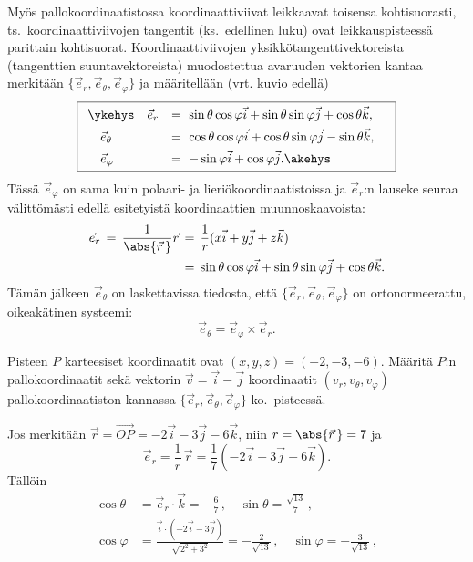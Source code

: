 Myös pallokoordinaatistossa koordinaattiviivat leikkaavat toisensa kohtisuorasti, ts.\
koordinaattiviivojen tangentit (ks.\ edellinen luku) ovat leikkauspisteessä parittain
kohtisuorat. Koordinaattiviivojen yksikkötangenttivektoreista (tangenttien suuntavektoreista)
muodostettua avaruuden vektorien kantaa merkitään $\{\vec e_r, \vec e_\theta, \vec e_\varphi\}$
ja määritellään (vrt. kuvio edellä)
\[
\boxed{
\begin{array}{ll}
\ykehys\quad \vec e_r &= \ \sin{\theta} \cos{\varphi} \vec i + \sin{\theta}\sin{\varphi} \vec j 
                                                           + \cos{\theta} \vec k, \quad \\[4pt]
\quad   \vec e_\theta &= \ \cos{\theta} \cos{\varphi} \vec i + \cos{\theta}\sin{\varphi} \vec j 
                                                             - \sin{\theta} \vec k, \\[4pt]
\quad  \vec e_\varphi &= \ -\sin{\varphi} \vec i + \cos{\varphi} \vec j. \akehys
\end{array}
}
\]
Tässä $\vec e_\varphi$ on sama kuin polaari- ja lieriökoordinaatistoissa ja $\vec e_r$:n 
lauseke seuraa välittömästi edellä esitetyistä koordinaattien muunnoskaavoista:
\begin{align*}
\vec e_r\,=\,\frac{1}{\abs{\vec r\,}}\vec r\,
               &=\,\frac{1}{r}(x\vec i+y\vec j+z\vec k) \\
               &=\,\sin{\theta} \cos{\varphi} \vec i + \sin{\theta}\sin{\varphi} \vec j 
                                                                  + \cos{\theta} \vec k.
\end{align*}
Tämän jälkeen $\vec e_\theta$ on laskettavissa tiedosta, että 
$\{\vec e_r,\vec e_\theta,\vec e_\varphi\}$ on ortonormeerattu, oikeakätinen systeemi: 
\[
\vec e_\theta=\vec e_\varphi\times\vec e_r.
\]
\begin{Exa} Pisteen $P$ karteesiset koordinaatit ovat $(x,y,z)=(-2,-3,-6)$. Määritä $P$:n
pallokoordinaatit sekä vektorin $\vec v=\vec i-\vec j$ koordinaatit $(v_r,v_\theta,v_\varphi)$
pallokoordinaatiston kannassa $\{\vec e_r,\vec e_\theta,\vec e_\varphi\}$ ko.\ pisteessä.
\end{Exa}
\ratk Jos merkitään $\vec r=\overrightarrow{OP}=-2\vec i-3\vec j-6\vec k$, niin
$r=\abs{\vec r\,}=7$ ja
\[
\vec e_r = \frac{1}{r}\,\vec r =\frac{1}{7}(-2\vec i-3 \vec j-6\vec k).
\]
Tällöin
\begin{align*}
\cos\theta\,&= \vec e_r\cdot\vec k = -\frac{6}{7}\,, \quad \sin\theta=\frac{\sqrt{13}}{7}\,, \\
\cos\varphi &= \frac{\vec i\cdot(-2\vec i-3\vec j)}{\sqrt{2^2+3^2}}=-\frac{2}{\sqrt{13}}\,,
                                                 \quad \sin\varphi =-\frac{3}{\sqrt{13}}\,,
\end{align*}

